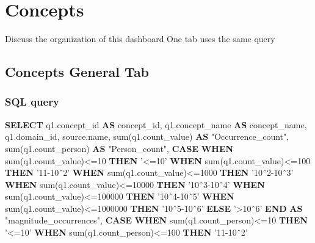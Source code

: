 \documentclass[]{book}
\newenvironment{Shaded}{\begin{snugshade}}{\end{snugshade}}
\newcommand{\KeywordTok}[1]{\textcolor[rgb]{0.13,0.29,0.53}{\textbf{#1}}}
\newcommand{\DecValTok}[1]{\textcolor[rgb]{0.00,0.00,0.81}{#1}}
\newcommand{\StringTok}[1]{\textcolor[rgb]{0.31,0.60,0.02}{#1}}
\newcommand{\OtherTok}[1]{\textcolor[rgb]{0.56,0.35,0.01}{#1}}
\newcommand{\FunctionTok}[1]{\textcolor[rgb]{0.00,0.00,0.00}{#1}}
\newcommand{\NormalTok}[1]{#1}
\begin{document}
\chapter{Concepts}\label{concepts}

Discuss the organization of this dashboard One tab uses the same query

\section{Concepts General Tab}\label{concepts-general-tab}

\subsection{SQL query}\label{sql-query-16}

\begin{Shaded}
\begin{Highlighting}[]
\KeywordTok{SELECT}
\NormalTok{    q1.concept_id }\KeywordTok{AS}\NormalTok{ concept_id,}
\NormalTok{    q1.concept_name }\KeywordTok{AS}\NormalTok{ concept_name,}
\NormalTok{    q1.domain_id,}
\NormalTok{    source.name,}
    \FunctionTok{sum}\NormalTok{(q1.count_value) }\KeywordTok{AS} \OtherTok{"Occurrence_count"}\NormalTok{,}
    \FunctionTok{sum}\NormalTok{(q1.count_person) }\KeywordTok{AS} \OtherTok{"Person_count"}\NormalTok{,}
    \KeywordTok{CASE} 
        \KeywordTok{WHEN} \FunctionTok{sum}\NormalTok{(q1.count_value)<=}\DecValTok{10} \KeywordTok{THEN} \StringTok{'<=10'}
        \KeywordTok{WHEN} \FunctionTok{sum}\NormalTok{(q1.count_value)<=}\DecValTok{100} \KeywordTok{THEN} \StringTok{'11-10ˆ2'}
        \KeywordTok{WHEN} \FunctionTok{sum}\NormalTok{(q1.count_value)<=}\DecValTok{1000} \KeywordTok{THEN} \StringTok{'10ˆ2-10ˆ3'}
        \KeywordTok{WHEN} \FunctionTok{sum}\NormalTok{(q1.count_value)<=}\DecValTok{10000} \KeywordTok{THEN} \StringTok{'10ˆ3-10ˆ4'}
        \KeywordTok{WHEN} \FunctionTok{sum}\NormalTok{(q1.count_value)<=}\DecValTok{100000} \KeywordTok{THEN} \StringTok{'10ˆ4-10ˆ5'}
        \KeywordTok{WHEN} \FunctionTok{sum}\NormalTok{(q1.count_value)<=}\DecValTok{1000000} \KeywordTok{THEN} \StringTok{'10ˆ5-10ˆ6'}
        \KeywordTok{ELSE} \StringTok{'>10ˆ6'}
    \KeywordTok{END} \KeywordTok{AS} \OtherTok{"magnitude_occurrences"}\NormalTok{,}
    \KeywordTok{CASE} 
        \KeywordTok{WHEN} \FunctionTok{sum}\NormalTok{(q1.count_person)<=}\DecValTok{10} \KeywordTok{THEN} \StringTok{'<=10'}
        \KeywordTok{WHEN} \FunctionTok{sum}\NormalTok{(q1.count_person)<=}\DecValTok{100} \KeywordTok{THEN} \StringTok{'11-10ˆ2'}

\end{Highlighting}
\end{Shaded}
\end{document}
